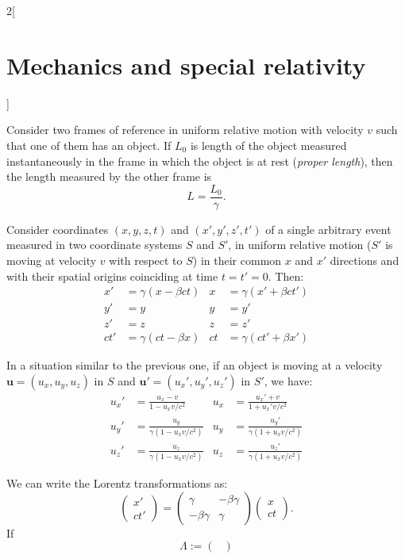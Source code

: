 \documentclass[class=article,10pt,crop=false]{standalone}
\begin{document}
\begin{multicols}{2}[\section{Mechanics and special relativity}]
\begin{concept}
Consider two frames of reference in uniform relative motion with velocity $v$ such that one of them has an object. If $L_0$ is length of the object measured instantaneously in the frame in which the object is at rest (\textit{proper length}), then the length measured by the other frame is
$$L=\frac{L_0}{\gamma}.$$
\end{concept}
\begin{concept}
Consider coordinates $(x,y,z,t)$ and $(x',y',z',t')$ of a single arbitrary event measured in two coordinate systems $S$ and $S'$, in uniform relative motion ($S'$ is moving at velocity $v$ with respect to $S$) in their common $x$ and $x'$ directions and  with their spatial origins coinciding at time $t=t'=0$. Then:
\begin{align*}
    x'&=\gamma(x-\beta ct) & x&=\gamma(x'+\beta ct')\\
    y'&=y & y&=y'\\
    z'&=z & z&=z'\\
    ct'&=\gamma(ct-\beta x) & ct&=\gamma(ct'+\beta x')
\end{align*}
\end{concept}
\begin{concept}
In a situation similar to the previous one, if an object is moving at a velocity $\boldsymbol{u}=(u_x,u_y,u_z)$ in $S$ and $\boldsymbol{u'}=(u_x',u_y',u_z')$ in $S'$, we have:
\begin{align*}
    u_x'&=\frac{u_x-v}{1-u_xv/c^2} & u_x&=\frac{u_x'+v}{1+u_x'v/c^2}\\
    u_y'&=\frac{u_y}{\gamma \left(1-u_xv/c^2\right)} & u_y&=\frac{u_y'}{\gamma \left(1+u_xv/c^2\right)}\\
    u_z'&=\frac{u_z}{\gamma \left(1-u_xv/c^2\right)} & u_z&=\frac{u_z'}{\gamma \left(1+u_xv/c^2\right)}
\end{align*}
\end{concept}
\begin{concept}
We can write the Lorentz transformations as: 
$$\begin{pmatrix}
x'\\
ct'
\end{pmatrix}=\begin{pmatrix}
\gamma & -\beta\gamma\\
-\beta\gamma & \gamma
\end{pmatrix}\begin{pmatrix}
x\\
ct
\end{pmatrix}.$$ If $$\Lambda:=\begin{pmatrix}

\end{pmatrix}$$
\end{concept}
\end{multicols}
\end{document}
